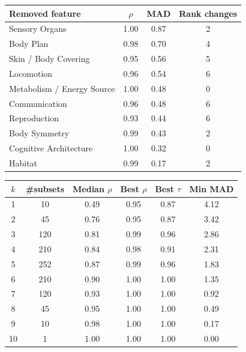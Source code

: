 \begin{tabular}{lccc}
\toprule
Removed feature & $\rho$ & MAD & Rank changes \\
\midrule
Sensory Organs & 1.00 & 0.87 & 2 \\
Body Plan & 0.98 & 0.70 & 4 \\
Skin / Body Covering & 0.95 & 0.56 & 5 \\
Locomotion & 0.96 & 0.54 & 6 \\
Metabolism / Energy Source & 1.00 & 0.48 & 0 \\
Communication & 0.96 & 0.48 & 6 \\
Reproduction & 0.93 & 0.44 & 6 \\
Body Symmetry & 0.99 & 0.43 & 2 \\
Cognitive Architecture & 1.00 & 0.32 & 0 \\
Habitat & 0.99 & 0.17 & 2 \\
\bottomrule
\end{tabular}

\vspace{0.5em}

\begin{tabular}{cccccc}
\toprule
$k$ & \#subsets & Median $\rho$ & Best $\rho$ & Best $\tau$ & Min MAD \\
\midrule
1 & 10 & 0.49 & 0.95 & 0.87 & 4.12 \\
2 & 45 & 0.76 & 0.95 & 0.87 & 3.42 \\
3 & 120 & 0.81 & 0.99 & 0.96 & 2.86 \\
4 & 210 & 0.84 & 0.98 & 0.91 & 2.31 \\
5 & 252 & 0.87 & 0.99 & 0.96 & 1.83 \\
6 & 210 & 0.90 & 1.00 & 1.00 & 1.35 \\
7 & 120 & 0.93 & 1.00 & 1.00 & 0.92 \\
8 & 45 & 0.95 & 1.00 & 1.00 & 0.49 \\
9 & 10 & 0.98 & 1.00 & 1.00 & 0.17 \\
10 & 1 & 1.00 & 1.00 & 1.00 & 0.00 \\
\bottomrule
\end{tabular}
